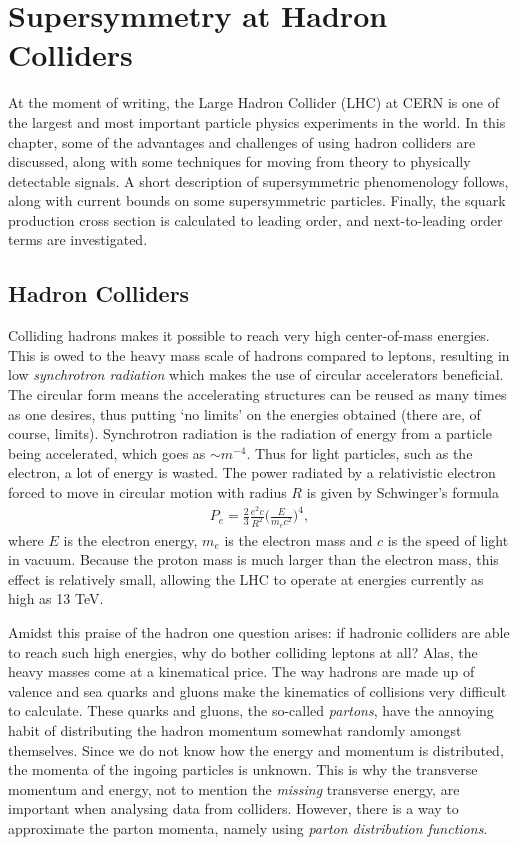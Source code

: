 \documentclass[twoside,english]{uiofysmaster}
\begin{document}
\tableofcontents

\chapter{Supersymmetry at Hadron Colliders}

At the moment of writing, the Large Hadron Collider (LHC) at CERN is one of the largest and most important particle physics experiments in the world. In this chapter, some of the advantages and challenges of using hadron colliders are discussed, along with some techniques for moving from theory to physically detectable signals. A short description of supersymmetric phenomenology follows, along with current bounds on some supersymmetric particles. Finally, the squark production cross section is calculated to leading order, and next-to-leading order terms are investigated.

\section{Hadron Colliders}

Colliding hadrons makes it possible to reach very high center-of-mass energies. This is owed to the heavy mass scale of hadrons compared to leptons, resulting in low \textit{synchrotron radiation} which makes the use of circular accelerators beneficial. The circular form means the accelerating structures can be reused as many times as one desires, thus putting `no limits' on the energies obtained (there are, of course, limits). Synchrotron radiation is the radiation of energy from a particle being accelerated, which goes as $\sim m^{-4}$. Thus for light particles, such as the electron, a lot of energy is wasted. The power radiated by a relativistic electron forced to move in circular motion with radius $R$ is given by Schwinger's formula \cite{Balerna2015}
\begin{align}
P_e = \frac{2}{3} \frac{e^2 c}{R^2} \Bigg( \frac{E}{m_e c^2} \Bigg)^4,
\end{align}
where $E$ is the electron energy, $m_e$ is the electron mass and $c$ is the speed of light in vacuum. Because the proton mass is much larger than the electron mass, this effect is relatively small, allowing the LHC to operate at energies currently as high as 13 TeV. 

Amidst this praise of the hadron one question arises: if hadronic colliders are able to reach such high energies, why do bother colliding leptons at all? Alas, the heavy masses come at a kinematical price. The way hadrons are made up of valence and sea quarks and gluons make the kinematics of collisions very difficult to calculate. These quarks and gluons, the so-called \textit{partons}, have the annoying habit of distributing the hadron momentum somewhat randomly amongst themselves. Since we do not know how the energy and momentum is distributed, the momenta of the ingoing particles is unknown. This is why the transverse momentum and energy, not to mention the \textit{missing} transverse energy, are important when analysing data from colliders. However, there is a way to approximate the parton momenta, namely using \textit{parton distribution functions}.
\end{document}
